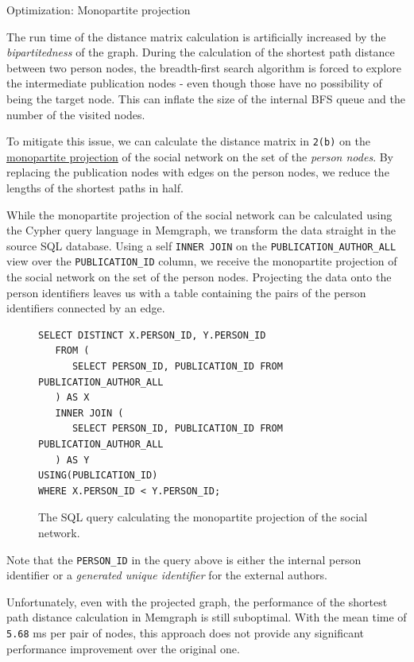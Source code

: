\begin{mybox}
    {Optimization: Monopartite projection}

    The run time of the distance matrix calculation is artificially increased by the \textit{bipartitedness} of the graph.
    During the calculation of the shortest path distance between two person nodes, 
    the breadth-first search algorithm is forced to explore the intermediate publication nodes - even though those have no possibility of being the target node.
    This can inflate the size of the internal BFS queue and the number of the visited nodes.
    
    To mitigate this issue, we can calculate the distance matrix in \texttt{2(b)} on the \hyperref[def:monopartite-projection]{monopartite projection} of the social network on 
    the set of the \textit{person nodes}. By replacing the publication nodes with edges on the person nodes, we reduce the lengths of the shortest paths in half.
\end{mybox}

While the monopartite projection of the social network can be calculated using the Cypher query language in Memgraph,
we transform the data straight in the source SQL database. Using a self \texttt{INNER JOIN} on the \texttt{PUBLICATION\_AUTHOR\_ALL} view over the \texttt{PUBLICATION\_ID} column,
we receive the monopartite projection of the social network on the set of the person nodes. Projecting the data onto the person identifiers
leaves us with a table containing the pairs of the person identifiers connected by an edge.

\begin{figure}[!ht]
\begin{verbatim}
SELECT DISTINCT X.PERSON_ID, Y.PERSON_ID 
   FROM (
      SELECT PERSON_ID, PUBLICATION_ID FROM PUBLICATION_AUTHOR_ALL
   ) AS X 
   INNER JOIN (
      SELECT PERSON_ID, PUBLICATION_ID FROM PUBLICATION_AUTHOR_ALL
   ) AS Y 
USING(PUBLICATION_ID)
WHERE X.PERSON_ID < Y.PERSON_ID;
\end{verbatim}
\captionsetup{width=.9\linewidth}
\caption{The SQL query calculating the monopartite projection of the social network.}
\label{fig:monopartite-projection}
\end{figure}

Note that the \texttt{PERSON\_ID} in the query above is either the internal person identifier or a \textit{generated unique identifier} for the external authors.

Unfortunately, even with the projected graph, the performance of the shortest path distance calculation in Memgraph is still suboptimal. 
With the mean time of \texttt{5.68} ms per pair of nodes, this approach does not provide any significant performance improvement over the original one.

